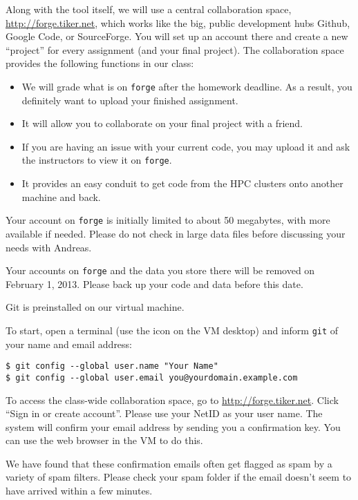 \documentclass[11pt]{article}
\begin{document}
Along with the tool itself, we will use a central collaboration space,
\url{http://forge.tiker.net}, which works like the big, public
development hubs Github, Google Code, or SourceForge. You will set up
an account there and create a new ``project'' for every assignment
(and your final project). The collaboration space provides the
following functions in our class:
\begin{itemize}
  \item We will grade what is on \texttt{forge} after the homework
  deadline. As a result, you definitely want to upload your finished
  assignment.
  \item It will allow you to collaborate on your final project with a friend.
  \item If you are having an issue with your current code, you may
  upload it and ask the instructors to view it on \texttt{forge}.
  \item It provides an easy conduit to get code from the HPC clusters
  onto another machine and back.
\end{itemize}

\begin{note}
Your account on \texttt{forge} is initially limited to
about 50 megabytes, with more available if needed. Please do not check
in large data files before discussing your needs with Andreas.

Your accounts on \texttt{forge} and the data you store there will be
removed on February 1, 2013. Please back up your code and data before
this date.
\end{note}
Git is preinstalled on our virtual machine.

To start, open a terminal (use the icon on the VM desktop) and inform
\texttt{git} of your name and email address:
\begin{lstlisting}
$ git config --global user.name "Your Name"
$ git config --global user.email you@yourdomain.example.com
\end{lstlisting}

To access the class-wide collaboration space, go to
\url{http://forge.tiker.net}. Click ``Sign in or create account''.
Please use your NetID as your user name. The system will confirm your
email address by sending you a confirmation key. You can use the
web browser in the VM to do this.

\begin{note}
We have found that these confirmation emails often get flagged as spam
by a variety of spam filters. Please check your spam folder if the
email doesn't seem to have arrived within a few minutes.
\end{note}
\end{document}
